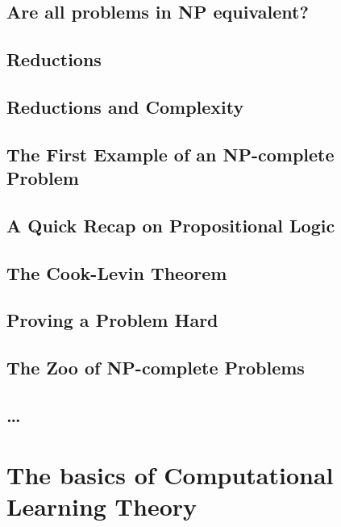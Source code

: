 \documentclass[12pt,a4paper,oneside]{book}
\begin{document}
\section{Are all problems in NP equivalent?}

\label{s_4_7}

\section{Reductions}

\label{s_4_8}

\section{Reductions and Complexity}

\label{s_4_9}

\section{The First Example of an NP-complete Problem}

\label{s_4_10}

\section{A Quick Recap on Propositional Logic}

\label{s_4_11}

\section{The Cook-Levin Theorem}

\label{s_4_12}

\section{Proving a Problem Hard}

\label{s_4_13}

\section{The Zoo of NP-complete Problems}

\label{s_4_14}

\section{\dots}

\label{s_4_15}

\chapter{The basics of Computational Learning Theory}
\label{c_5}
\end{document}
